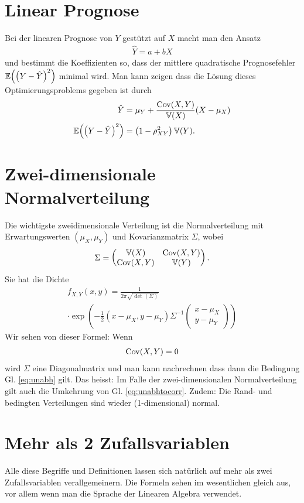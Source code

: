 \section{Linear Prognose}
Bei der linearen Prognose von $Y$ gestützt auf $X$ macht man den Ansatz
\begin{gather*}
	\hat{Y}=a+bX
\end{gather*}
und bestimmt die Koeffizienten so, dass der mittlere quadratische Prognosefehler $\operatorname{\mathbb E}\!\left(\left( Y-\hat{Y} \right)^2  \right)$ minimal wird. Man kann zeigen dass die Lösung dieses Optimierungsproblems gegeben ist durch
\begin{align*}
	\hat{Y}&=\mu_{Y}+\frac{\operatorname{Cov}(X,Y)}{\operatorname{\mathbb V}(X)}(X-\mu_X)\\
	\operatorname{\mathbb E}\!\left(\left( Y-\hat{Y} \right)^2  \right)
	&=\left( 1-\rho_{XY}^{2} \right)\operatorname{\mathbb V}(Y).
\end{align*}
\section{Zwei-dimensionale Normalverteilung}
\label{sec6.6}
Die wichtigste zweidimensionale Verteilung ist die Normalverteilung mit Erwartungswerten $(\mu_{X},\mu_Y)$ und Kovarianzmatrix $\Sigma$, wobei
\begin{gather*}
	\Sigma=
	\begin{pmatrix}
		\operatorname{\mathbb V}(X)&\operatorname{Cov}(X,Y)\\
		\operatorname{Cov}(X,Y)&\operatorname{\mathbb V}(Y)
	\end{pmatrix}.
	\end{gather*}
Sie hat die Dichte
\begin{multline*}
	f_{X,Y}(x,y)=\frac{1}{2\pi\sqrt{\det(\Sigma)}}\\
	 \cdot \exp\!\left( -\frac{1}{2}\left( x-\mu_X,y-\mu_Y \right)\Sigma^{-1}
	\begin{pmatrix}
		x-\mu_X\\
		y-\mu_Y
	\end{pmatrix}
	\right)
\end{multline*}
Wir sehen von dieser Formel: Wenn 
\begin{gather*}
	\operatorname{Cov}(X,Y)=0
\end{gather*}
wird $\Sigma$ eine Diagonalmatrix und man kann nachrechnen dass dann die Bedingung Gl. \ref{eq:unabh} gilt. Das heisst: Im Falle der zwei-dimensionalen Normalverteilung gilt auch die Umkehrung von Gl. \ref{eq:unabhtocorr}. Zudem: Die Rand- und bedingten Verteilungen sind wieder (1-dimensional) normal.
\section{Mehr als 2 Zufallsvariablen}
Alle diese Begriffe und Definitionen lassen sich natürlich auf mehr als zwei Zufallsvariablen verallgemeinern. Die Formeln sehen im wesentlichen gleich aus, vor allem wenn man die Sprache der Linearen Algebra verwendet.

